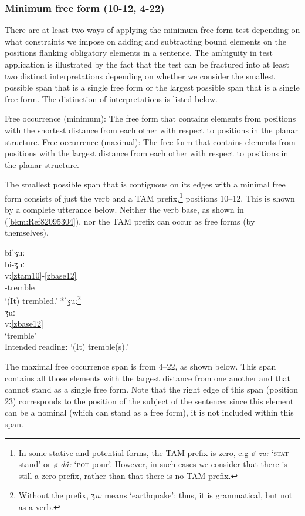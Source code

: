 \documentclass[output=paper]{langscibook}
\begin{document}
\subsubsection{Minimum free form (10-12, 4-22)} \label{sec:key:4.1.1}

There are at least two ways of applying the minimum free form test depending on what constraints we impose on adding and subtracting bound elements on the positions flanking obligatory elements in a sentence. The ambiguity in test application is illustrated by the fact that the test can be fractured into at least two distinct interpretations depending on whether we consider the smallest possible span that is a single free form or the largest possible span that is a single free form. The distinction of interpretations is listed below.

\ea Free occurrence (minimum): The free form that contains elements from positions with the shortest distance from each other with respect to positions in the planar structure.
\ex Free occurrence (maximal): The free form that contains elements from positions with the largest distance from each other with respect to positions in the planar structure.
\z 

The smallest possible span that is contiguous on its edges with a minimal free form consists of just the verb and a TAM prefix,\footnote{In some stative and potential forms, the TAM prefix is zero, e.g \textit{ø-zu:} `\textsc{stat}-stand' or \textit{ø-dâ:} `\textsc{pot}-pour'. However, in such cases we consider that there is still a zero prefix, rather than that there is no TAM prefix.} positions 10--12. This is shown by a complete utterance below. Neither the verb base, as shown in (\ref{bkm:Ref82095304}), nor the TAM prefix can occur as free forms (by themselves).


\ea\label{ex:key:zap:14}
{biˈʒuː} \\
\glll bi-ʒuː\\
v:\ref{ztam10}-\ref{zbase12} \\ 
\Compl-tremble\\
\glt`(It) trembled.'
\ex\label{bkm:Ref82095304} 
{*ˈʒuː\footnote{Without the prefix, ʒ\textit{u:} means `earthquake'; thus, it is grammatical, but not as a verb.}} \\
\glll ʒuː\\
v:\ref{zbase12} \\
`tremble'\\
\glt Intended reading: `(It) tremble(s).'
\z

The maximal free occurrence span is from 4--22, as shown below. This span contains all those elements with the largest distance from one another and that cannot stand as a single free form. Note that the right edge of this span (position 23) corresponds to the position of the subject of the sentence; since this element can be a nominal (which can stand as a free form), it is not included within this span.
\end{document}
